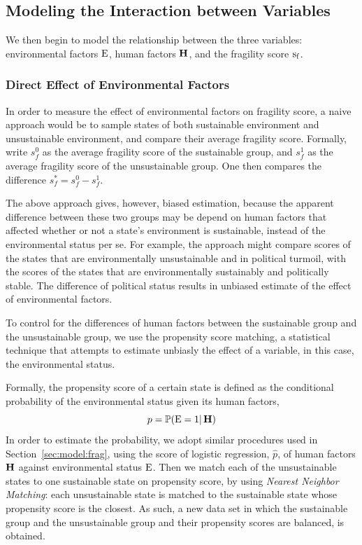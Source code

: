 \subsection{Modeling the Interaction between Variables}
We then begin to model the relationship between the three variables: environmental factors $\operatorname*{E}$, human factors $\operatorname*{\mathbf{H}}$, and the fragility score $\operatorname*{s_f}$. 

\subsubsection{Direct Effect of Environmental Factors} In order to measure the effect of environmental factors on fragility score, a naive approach would be to sample states of both sustainable environment and unsustainable environment, and compare their average fragility score. Formally, write $s^0_f$ as the average fragility score of the sustainable group, and $s^1_f$ as the average fragility score of the unsustainable group. One then compares the difference $s^*_f=s^0_f - s^1_f$.

The above approach gives, however, biased estimation, because the apparent difference between these two groups may be depend on human factors that affected whether or not a state's environment is sustainable, instead of the environmental status per se. For example, the approach might compare scores of the states that are environmentally unsustainable and in political turmoil, with the scores of the states that are environmentally sustainably and politically stable. The difference of political status results in unbiased estimate of the effect of environmental factors.

To control for the differences of human factors between the sustainable group and the unsustainable group, we use the propensity score matching, a statistical technique that attempts to estimate unbiasly the effect of a variable, in this case, the environmental status.

Formally, the propensity score of a certain state is defined as the conditional probability of the environmental status given its human factors,
\begin{equation}
   p=\mathbb P(\operatorname*{E}=1|\operatorname*{\mathbf{H}})
   \label{eqn:model:propensity}
\end{equation}
In order to estimate the probability, we adopt similar procedures used in Section~\ref{sec:model:frag}, using the score of logistic regression, $\hat{p}$, of human factors $\operatorname*{\mathbf{H}}$ against environmental status $\operatorname*{E}$. Then we match each of the unsustainable states to one sustainable state on propensity score, by using \emph{Nearest Neighbor Matching}: each unsustainable state is matched to the sustainable state whose propensity score is the closest. As such, a new data set in which the sustainable group and the unsustainable group and their propensity scores are balanced, is obtained. 

